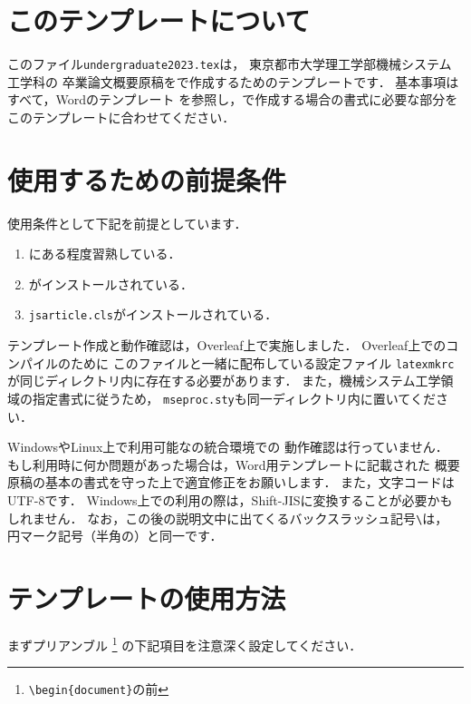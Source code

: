 \documentclass[twocolumn]{jsarticle}
\begin{document}
\btitle

\section{このテンプレートについて}
このファイル\texttt{undergraduate2023.tex}は，
東京都市大学理工学部機械システム工学科の
卒業論文概要原稿を\LaTeXe で作成するためのテンプレートです．
基本事項はすべて，Wordのテンプレート\cite{msetemplateB}
を参照し，\LaTeXe で作成する場合の書式に必要な部分を
このテンプレートに合わせてください．

\section{使用するための前提条件}
使用条件として下記を前提としています．
\begin{enumerate}
\item \LaTeXe にある程度習熟している\cite{Okumura2023}．
\item \pLaTeXe がインストールされている． %
\item \texttt{jsarticle.cls}がインストールされている\cite{Okumura2023}．
\end{enumerate}

テンプレート作成と動作確認は，Overleaf上で実施しました．
Overleaf上でのコンパイルのために
このファイルと一緒に配布している設定ファイル
\texttt{latexmkrc}が同じディレクトリ内に存在する必要があります．
また，機械システム工学領域の指定書式に従うため，
\texttt{mseproc.sty}も同一ディレクトリ内に置いてください．

WindowsやLinux上で利用可能な\LaTeXe の統合環境での
動作確認は行っていません．
もし利用時に何か問題があった場合は，Word用テンプレートに記載された
概要原稿の基本の書式を守った上で適宜修正をお願いします．
また，文字コードはUTF-8です．
Windows上での利用の際は，Shift-JISに変換することが必要かもしれません．
なお，この後の説明文中に出てくるバックスラッシュ記号\verb+\+は，
円マーク記号（半角の\yen）と同一です．


\section{テンプレートの使用方法}
まずプリアンブル
\footnote{\verb+\begin{document}+の前}
の下記項目を注意深く設定してください．
\end{document}

